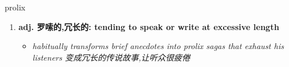 
\begin{frame}
{\huge prolix}
\begin{center}
\begin{enumerate}\Large
  \item \textbf{adj. 罗嗦的,冗长的: tending to speak or write at excessive length}
  \begin{itemize}
    \item \em{\Large{habitually transforms brief anecdotes into prolix sagas that exhaust his listeners 变成冗长的传说故事,让听众很疲倦}}
  \end{itemize}
\end{enumerate}
\end{center}
\end{frame}
